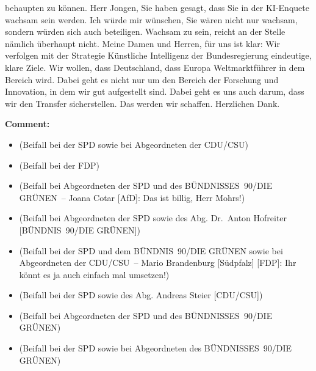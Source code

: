 \documentclass{article}
\begin{document}
behaupten zu können.  Herr Jongen, Sie haben gesagt, dass Sie in der KI-Enquete wachsam sein werden. Ich würde mir wünschen, Sie wären nicht nur wachsam, sondern würden sich auch beteiligen. Wachsam zu sein, reicht an der Stelle nämlich überhaupt nicht.  Meine Damen und Herren, für uns ist klar: Wir verfolgen mit der Strategie Künstliche Intelligenz der Bundesregierung eindeutige, klare Ziele. Wir wollen, dass Deutschland, dass Europa Weltmarktführer in dem Bereich wird. Dabei geht es nicht nur um den Bereich der Forschung und Innovation, in dem wir gut aufgestellt sind. Dabei geht es uns auch darum, dass wir den Transfer sicherstellen. Das werden wir schaffen. Herzlichen Dank.  

\noindent\textbf{Comment:}
\begin{itemize}
    \setlength\itemsep{-3pt}
    \item (Beifall bei der SPD sowie bei Abgeordneten der CDU/CSU)
    \setlength\itemsep{-3pt}
    \item (Beifall bei der FDP)
    \setlength\itemsep{-3pt}
    \item (Beifall bei Abgeordneten der SPD und des BÜNDNISSES 90/DIE GRÜNEN – Joana Cotar [AfD]: Das ist billig, Herr Mohrs!)
    \setlength\itemsep{-3pt}
    \item (Beifall bei Abgeordneten der SPD sowie des Abg. Dr. Anton Hofreiter [BÜNDNIS 90/DIE GRÜNEN])
    \setlength\itemsep{-3pt}
    \item (Beifall bei der SPD und dem BÜNDNIS 90/DIE GRÜNEN sowie bei Abgeordneten der CDU/CSU – Mario Brandenburg [Südpfalz] [FDP]: Ihr könnt es ja auch einfach mal umsetzen!)
    \setlength\itemsep{-3pt}
    \item (Beifall bei der SPD sowie des Abg. Andreas Steier [CDU/CSU])
    \setlength\itemsep{-3pt}
    \item (Beifall bei Abgeordneten der SPD und des BÜNDNISSES 90/DIE GRÜNEN)
    \setlength\itemsep{-3pt}
    \item (Beifall bei der SPD sowie bei Abgeordneten des BÜNDNISSES 90/DIE GRÜNEN)
\end{itemize}
\end{document}
